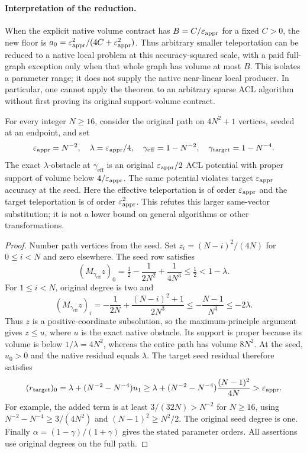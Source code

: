 \paragraph{Interpretation of the reduction.}
When the explicit native volume contract has $B=C/\varepsilon_{\mathrm{appr}}$ for a
fixed $C>0$, the new floor is
$a_0=\varepsilon_{\mathrm{appr}}^2/(4C+\varepsilon_{\mathrm{appr}}^2)$.
Thus arbitrary smaller teleportation can be reduced to a native local
problem at this accuracy-squared scale, with a paid full-graph exception
only when that whole graph has volume at most $B$. This isolates a
parameter range; it does not supply the native near-linear local producer.
In particular, one cannot apply the theorem to an arbitrary sparse ACL
algorithm without first proving its original support-volume contract.

\begin{proposition}
\label{prop:op3-large-alpha-floor-obstruction}
For every integer $N\geq16$, consider the original path on
$4N^2+1$ vertices, seeded at an endpoint, and set
\[
 \varepsilon_{\mathrm{appr}}=N^{-2},\quad \lambda=\varepsilon_{\mathrm{appr}}/4,\quad
 \gamma_{\mathrm{eff}}=1-N^{-2},\quad
 \gamma_{\mathrm{target}}=1-N^{-4}.
\]
The exact $\lambda$-obstacle at $\gamma_{\mathrm{eff}}$ is an
original $\varepsilon_{\mathrm{appr}}/2$ ACL potential with proper support of volume
below $4/\varepsilon_{\mathrm{appr}}$. The same potential violates target
$\varepsilon_{\mathrm{appr}}$ accuracy at the seed. Here the effective teleportation
is of order $\varepsilon_{\mathrm{appr}}$ and the target teleportation is of order
$\varepsilon_{\mathrm{appr}}^2$. This refutes this larger same-vector substitution;
it is not a lower bound on general algorithms or other transformations.
\end{proposition}
\begin{proof}
Number path vertices from the seed. Set
$z_i=(N-i)^2/(4N)$ for $0\leq i<N$ and zero elsewhere.
The seed row satisfies
\[
 (M_{\gamma_{\mathrm{eff}}}z)_0
 =\tfrac12-\frac1{2N^2}+\frac1{4N^3}
 \leq\tfrac12<1-\lambda.
\]
For $1\leq i<N$, original degree is two and
\[
 (M_{\gamma_{\mathrm{eff}}}z)_i
 =-\frac1{2N}+\frac{(N-i)^2+1}{2N^3}
 \leq-\frac{N-1}{N^3}\leq-2\lambda.
\]
Thus $z$ is a positive-coordinate subsolution, so the maximum-principle
argument gives $z\leq u$, where $u$ is the exact native obstacle.
Its support is proper because its volume is below $1/\lambda=4N^2$,
whereas the entire path has volume $8N^2$.
At the seed, $u_0>0$ and the native residual equals $\lambda$.
The target seed residual therefore satisfies
\[
 (r_{\mathrm{target}})_0
 =\lambda+(N^{-2}-N^{-4})u_1
 \geq\lambda+(N^{-2}-N^{-4})\frac{(N-1)^2}{4N}
 >\varepsilon_{\mathrm{appr}}.
\]
For example, the added term is at least $3/(32N)>N^{-2}$ for
$N\geq16$, using $N^{-2}-N^{-4}\geq3/(4N^2)$ and
$(N-1)^2\geq N^2/2$. The original seed degree is one.
Finally $\alpha=(1-\gamma)/(1+\gamma)$ gives the stated parameter
orders. All assertions use original degrees on the full path.
\end{proof}

